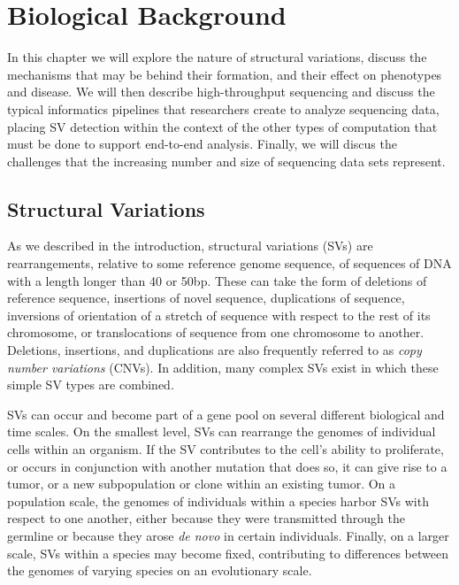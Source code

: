 \chapter{Biological Background}\label{chap_background}

In this chapter we will explore the nature of structural variations, discuss the mechanisms that may be behind their formation, and their effect on phenotypes and disease. We will then describe high-throughput sequencing and discuss the typical informatics pipelines that researchers create to analyze sequencing data, placing SV detection within the context of the other types of computation that must be done to support end-to-end analysis. Finally, we will discus the challenges that the increasing number and size of sequencing data sets represent.

\section{Structural Variations}

As we described in the introduction, structural variations (SVs) are rearrangements, relative to some reference genome sequence, of sequences of DNA with a length longer than 40 or 50bp. These can take the form of deletions of reference sequence, insertions of novel sequence, duplications of sequence, inversions of orientation of a stretch of sequence with respect to the rest of its chromosome, or translocations of sequence from one chromosome to another. Deletions, insertions, and duplications are also frequently referred to as \emph{copy number variations} (CNVs). In addition, many complex SVs exist in which these simple SV types are combined.

SVs can occur and become part of a gene pool on several different biological and time scales. On the smallest level, SVs can rearrange the genomes of individual cells within an organism. If the SV contributes to the cell's ability to proliferate, or occurs in conjunction with another mutation that does so, it can give rise to a tumor, or a new subpopulation or clone within an existing tumor. On a population scale, the genomes of individuals within a species harbor SVs with respect to one another, either because they were transmitted through the germline or because they arose \emph{de novo} in certain individuals. Finally, on a larger scale, SVs within a species may become fixed, contributing to differences between the genomes of varying species on an evolutionary scale.

